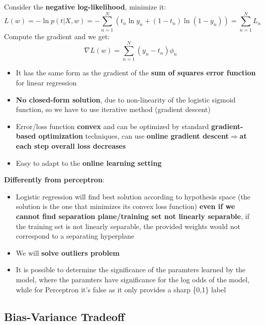     Consider the \textbf{negative log-likelihood}, minimize it:
    $$L(w)=-\ln p(t|X,w)=-\sum_{n=1}^N(t_n\ln y_n+(1-t_n)\ln(1-y_n))=\sum_{n=1}^N L_n$$
    Compute the gradient and we get:
    $$\nabla L(w)=\sum_{n=1}^N(y_n-t_n)\phi_n$$
    \begin{itemize}
        \item It has the same form as the gradient of the \textbf{sum of squares error function} for linear regression
        \item \textbf{No closed-form solution}, due to non-linearity of the logistic sigmoid function, so we have to use iterative method (gradient descent)
        \item Error/loss function \textbf{convex} and can be optimized by standard \textbf{gradient-based optimization} techniques, can use \textbf{online gradient descent$\Rightarrow$at each step overall loss decreases}
        \item Easy to adapt to the \textbf{online learning setting}
    \end{itemize}
    \textbf{Differently from perceptron}:
    \begin{itemize}
        \item Logistic regression will find best solution according to hypothesis space (the solution is the one that minimizes its convex loss function) \textbf{even if we cannot find separation plane/training set not linearly separable}, if the training set is not linearly separable, the provided weights would not correspond to a separating hyperplane
        \item We will \textbf{solve outliers problem}
        \item It is possible to determine the significance of the paramters learned by the model, where the paramters have significance for the log odds of the model, while for Perceptron it's false as it only provides a sharp \{0,1\} label
    \end{itemize}

\subsection{Bias-Variance Tradeoff}
